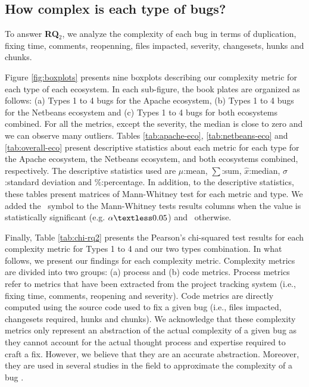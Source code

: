 
\subsection{How complex is each type of bugs?}

To answer {\bf RQ$_2$}, we analyze the complexity of each bug in terms of duplication, fixing time, comments, reopenning, files impacted, severity, changesets, hunks and chunks.

Figure \ref{fig:boxplots} presents nine boxplots describing our complexity metric for each type of each ecosystem.
In each sub-figure, the book plates are organized as follows: (a) Types 1 to 4 bugs for the Apache ecosystem, (b) Types 1 to 4 bugs for  the Netbeans ecosystem and (c) Types 1 to 4 bugs for both ecosystems combined.
For all the metrics, except the severity, the median is close to zero and we can observe many outliers.
Tables \ref{tab:apache-eco}, \ref{tab:netbeans-eco} and \ref{tab:overall-eco} present descriptive statistics about each metric for each type for the Apache ecosystem, the Netbeans ecosystem, and both ecosystems combined, respectively.
The descriptive statistics used are $\mu$:mean, $\sum$:sum, $\hat{x}$:median, $\sigma$:standard deviation and $\%$:percentage.
In addition, to the descriptive statistics, these tables present matrices of Mann-Whitney test for each metric and type.
We added the \checkmark~symbol to the Mann-Whitney tests results columns when the value is statistically significant (e.g. $\alpha \textless 0.05$) and \xmark~otherwise.

Finally, Table \ref{tab:chi-rq2} presents the Pearson's chi-squared test results for each complexity metric for Types 1 to 4 and our two types combination.
In what follows, we present our findings for each complexity metric.
Complexity metrics are divided into two groups: (a) process and (b) code metrics.
Process metrics refer to metrics that have been extracted from the project tracking system (i.e., fixing time, comments, reopening and severity).
Code metrics are directly computed using the source code used to fix a given bug (i.e., files impacted, changesets required, hunks and chunks).
We acknowledge that these complexity metrics only represent an abstraction of the actual complexity of a given bug as they cannot account for the actual thought process and expertise required to craft a fix.
However, we believe that they are an accurate abstraction. Moreover, they are used in several studies in the field to  approximate the complexity of a bug \cite{Weiß2007,Saha2014,Nam2013,Anvik2006,Nagappan}.

